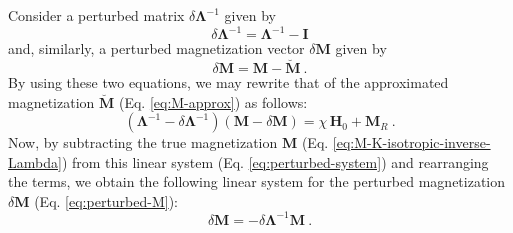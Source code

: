 \documentclass[gmd, manuscript]{copernicus}
\begin{document}
Consider a perturbed matrix $\delta \mathbf{\Lambda}^{-1}$ given by
\begin{equation}
\delta \mathbf{\Lambda}^{-1} = \mathbf{\Lambda}^{-1} - \mathbf{I}
\label{eq:perturbed-inverse-Lambda}
\end{equation}
and, similarly, a perturbed magnetization vector $\delta \mathbf{M}$
given by
\begin{equation}
\delta \mathbf{M} = \mathbf{M} - \breve{\mathbf{M}} \: .
\label{eq:perturbed-M}
\end{equation}
By using these two equations, we may rewrite that of the approximated
magnetization $\breve{\mathbf{M}}$ (Eq. \ref{eq:M-approx}) as follows:
\begin{equation}
\left( \mathbf{\Lambda}^{-1} - \delta \mathbf{\Lambda}^{-1} \right)
\left( \mathbf{M} - \delta \mathbf{M} \right) =
\chi \, \mathbf{H}_{0} +
\mathbf{M}_{R} \: .
\label{eq:perturbed-system}
\end{equation}
Now, by subtracting the true magnetization
$\mathbf{M}$ (Eq. \ref{eq:M-K-isotropic-inverse-Lambda})
from this linear system (Eq. \ref{eq:perturbed-system})
and rearranging the terms, we obtain the following linear
system for the perturbed magnetization $\delta \mathbf{M}$
(Eq. \ref{eq:perturbed-M}):
\begin{equation}
\delta \mathbf{M} = - \delta \mathbf{\Lambda}^{-1} \mathbf{M} \: .
\label{eq:perturbed-M-system}
\end{equation}
\end{document}
